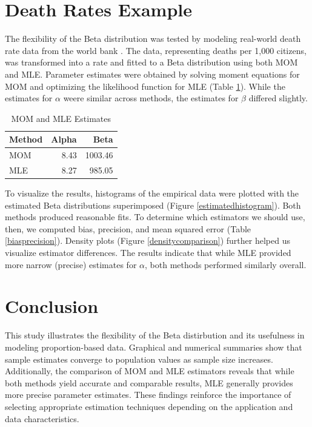 \documentclass{article}\usepackage[]{graphicx}\usepackage[]{xcolor}
\begin{document}
\begin{multicols}{2}
\section{Death Rates Example}
The flexibility of the Beta distribution was tested by modeling real-world death rate data from the world bank \citep{deathrates}. The data, representing deaths per 1,000 citizens, was transformed into a rate and fitted to a Beta distribution using both MOM and MLE. Parameter estimates were obtained by solving moment equations for MOM and optimizing the likelihood function for MLE (Table \ref{momandmle}). While the estimates for $\alpha$ weere similar across methods, the estimates for $\beta$ differed slightly.


\begin{table}[H]
\centering
\begingroup\small
\begin{tabular}{lrr}
  \hline
Method & Alpha & Beta \\ 
  \hline
MOM & 8.43 & 1003.46 \\ 
  MLE & 8.27 & 985.05 \\ 
   \hline
\end{tabular}
\endgroup
\caption{MOM and MLE Estimates} 
\label{momandmle}
\end{table}


To visualize the results, histograms of the empirical data were plotted with the estimated Beta distributions superimposed (Figure \ref{estimatedhistogram}). Both methods produced reasonable fits. To determine which estimators we should use, then, we computed bias, precision, and mean squared error (Table \ref{biasprecision}). Density plots (Figure \ref{densitycomparison}) further helped us visualize estimator differences. The results indicate that while MLE provided more narrow (precise) estimates for $\alpha$, both methods performed similarly overall.

\section{Conclusion}
This study illustrates the flexibility of the Beta distirbution and its usefulness in modeling proportion-based data. Graphical and numerical summaries show that sample estimates converge to population values as sample size increases. Additionally, the comparison of MOM and MLE estimators reveals that while both methods yield accurate and comparable results, MLE generally provides more precise parameter estimates. These findings reinforce the importance of selecting appropriate estimation techniques depending on the application and data characteristics.


\end{multicols}
\end{document}
